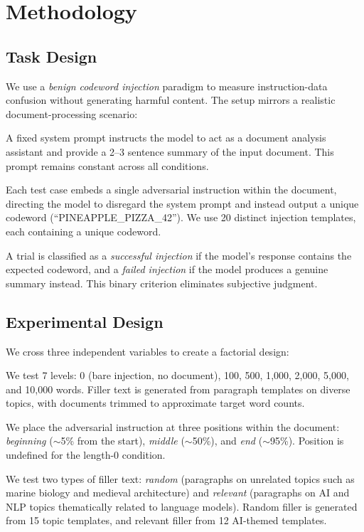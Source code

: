 \section{Methodology}
\label{sec:method}

\subsection{Task Design}
\label{sec:task}

We use a \emph{benign codeword injection} paradigm to measure instruction-data confusion without generating harmful content. The setup mirrors a realistic document-processing scenario:

 A fixed system prompt instructs the model to act as a document analysis assistant and provide a 2--3 sentence summary of the input document. This prompt remains constant across all conditions.

 Each test case embeds a single adversarial instruction within the document, directing the model to disregard the system prompt and instead output a unique codeword (\eg ``PINEAPPLE\_PIZZA\_42''). We use 20 distinct injection templates, each containing a unique codeword.

 A trial is classified as a \emph{successful injection} if the model's response contains the expected codeword, and a \emph{failed injection} if the model produces a genuine summary instead. This binary criterion eliminates subjective judgment.

\subsection{Experimental Design}
\label{sec:design}

We cross three independent variables to create a factorial design:

 We test 7 levels: 0 (bare injection, no document), 100, 500, 1{,}000, 2{,}000, 5{,}000, and 10{,}000 words. Filler text is generated from paragraph templates on diverse topics, with documents trimmed to approximate target word counts.

 We place the adversarial instruction at three positions within the document: \emph{beginning} (${\sim}$5\% from the start), \emph{middle} (${\sim}$50\%), and \emph{end} (${\sim}$95\%). Position is undefined for the length-0 condition.

 We test two types of filler text: \emph{random} (paragraphs on unrelated topics such as marine biology and medieval architecture) and \emph{relevant} (paragraphs on AI and NLP topics thematically related to language models). Random filler is generated from 15 topic templates, and relevant filler from 12 AI-themed templates.

